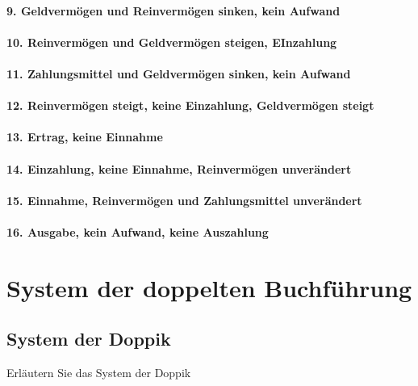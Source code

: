 \documentclass[paper=a4, fontsize=11pt]{scrartcl}
\numberwithin{equation}{section}
\numberwithin{figure}{section}
\numberwithin{table}{section}
\begin{document}
\paragraph{9. Geldvermögen und Reinvermögen sinken, kein Aufwand}

\paragraph{10. Reinvermögen und Geldvermögen steigen, EInzahlung}

\paragraph{11. Zahlungsmittel und Geldvermögen sinken, kein Aufwand}

\paragraph{12. Reinvermögen steigt, keine Einzahlung, Geldvermögen steigt}

\paragraph{13. Ertrag, keine Einnahme}
 
\paragraph{14. Einzahlung, keine Einnahme, Reinvermögen unverändert}

\paragraph{15. Einnahme, Reinvermögen und Zahlungsmittel unverändert}

\paragraph{16. Ausgabe, kein Aufwand, keine Auszahlung}

\section{System der doppelten Buchführung}
\subsection{System der Doppik}
Erläutern Sie das System der Doppik \\
\end{document}
